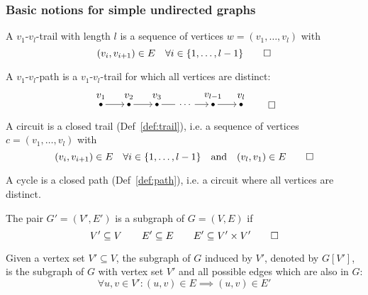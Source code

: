 \subsubsection{Basic notions for simple undirected graphs}
\begin{definition}[Trail]\label{def:trail}
A \(v_1\)-\(v_l\)-trail with length \(l\) is a sequence of vertices \(w = (v_1, \ldots, v_l)\) with 
\[
  (v_i, v_{i+1}) \in E \quad \forall i \in \{1, \ldots, l-1\} \qedhere
\]
\end{definition}
\begin{definition}[Path]\label{def:path}
  A \(v_1\)-\(v_l\)-path is a \(v_1\)-\(v_l\)-trail for which all vertices are distinct:
\[
\begin{tikzpicture}
  \tikzset{
dot/.style = {circle, fill, inner sep=1.2pt, outer sep=3pt}
}
\node[dot, label={[yshift=-3pt]above:$v_1$}] (v1) at (0,0) {};
\node[dot, label={[yshift=-3pt]above:$v_2$}] (v2) at (1,0) {};
\node[dot, label={[yshift=-3pt]above:$v_3$}] (v3) at (2,0) {};
\node[] (v4) at (3,0) {$\ldots$};
\node[dot, label={[yshift=-3pt]above:$v_{l-1}$}] (vlm1) at (4,0) {};
\node[dot, label={[yshift=-3pt]above:$v_l$}] (vl) at (5,0) {};
\draw[->] (v1) -- (v2);
\draw[->] (v2) -- (v3);
\draw[] (v3) -- (2.65,0);
\draw[->] (3.35,0) -- (vlm1);
\draw[->] (vlm1) -- (vl);
\end{tikzpicture} \qedhere
\]
\end{definition}
\begin{definition}[Circuit]\label{def:circuit}
  A circuit is a closed trail (Def~\ref{def:trail}), i.e. a sequence of vertices \(c = (v_1, \ldots, v_l)\) with
\[
  (v_i, v_{i+1}) \in E \quad\forall i \in \{1, \ldots, l-1\} \quad \text{and} \quad
  (v_l, v_1) \in E \qedhere
\]
\end{definition}
\begin{definition}[Cycle]\label{def:cycle}
  A cycle is a closed path (Def~\ref{def:path}), i.e. a circuit where all vertices are distinct.
\end{definition}
\begin{definition}[Subgraph]\label{def:subgraph}
The pair \(G'=(V',E')\) is a subgraph of \(G=(V,E)\) if
\[
  V' \subseteq V \qquad E' \subseteq E \qquad E' \subseteq V'\times V' \qedhere
\]
\end{definition}
Given a vertex  set \(V' \subseteq V\), the subgraph of \(G\) induced by \(V'\), denoted by \(G[V']\), is the subgraph of \(G\) with vertex set \(V'\) and all possible edges which are also in \(G\):
\[
  \forall u,v\in V': (u,v)\in E \implies (u,v)\in E'
\]

